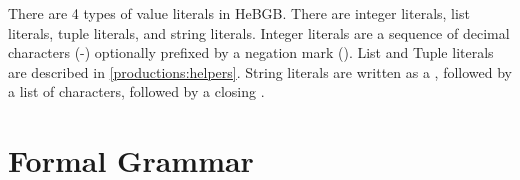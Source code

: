 \documentclass[12pt]{article}
\begin{document}
\begin{rule_box}[Keywords]
\label{keywords}
 \qquad {} \qquad {} \qquad {} \qquad
{} \qquad {} \qquad {} \qquad {}
\end{rule_box}

There are 4 types of value literals in HeBGB. There are integer literals,
list literals, tuple literals, and string literals. Integer literals are
a sequence of decimal characters (-) optionally prefixed
by a negation mark (\Term{-}). List and Tuple literals are described
in \ref{productions:helpers}. String literals are written as a ,
followed by a list of characters, followed by a closing .

\section{Formal Grammar}
\end{document}
